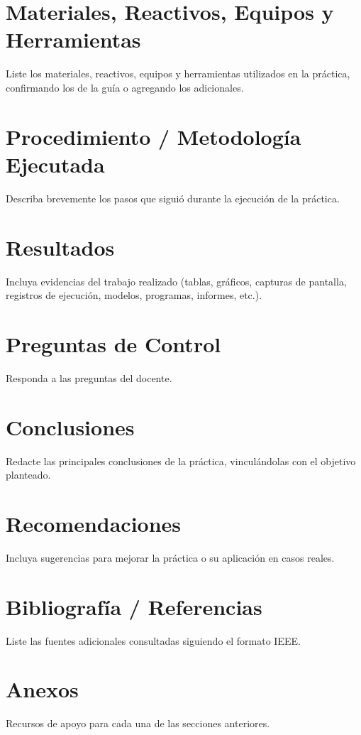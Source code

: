 \documentclass[11pt,a4paper]{article}
\begin{document}
\section{Materiales, Reactivos, Equipos y Herramientas}
Liste los materiales, reactivos, equipos y herramientas utilizados en la práctica, confirmando los de la guía o agregando los adicionales.

\section{Procedimiento / Metodología Ejecutada}
Describa brevemente los pasos que siguió durante la ejecución de la práctica.

\section{Resultados}
Incluya evidencias del trabajo realizado (tablas, gráficos, capturas de pantalla, registros de ejecución, modelos, programas, informes, etc.).

\newpage

\section{Preguntas de Control}
Responda a las preguntas del docente.

\section{Conclusiones}
Redacte las principales conclusiones de la práctica, vinculándolas con el objetivo planteado.

\section{Recomendaciones}
Incluya sugerencias para mejorar la práctica o su aplicación en casos reales.

\section{Bibliografía / Referencias}
Liste las fuentes adicionales consultadas siguiendo el formato IEEE.

\section{Anexos}
Recursos de apoyo para cada una de las secciones anteriores.
\end{document}

